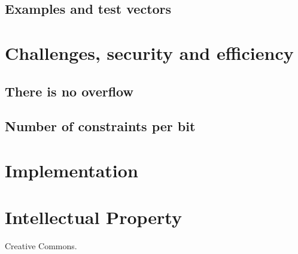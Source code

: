 \documentclass[11pt]{article}
\begin{document}
		\subsection{Examples and test vectors}
		
	\section{Challenges, security and efficiency}

	
		\subsection{There is no overflow}	 						
		\subsection{Number of constraints per bit  }
																			
			
	\section{Implementation}										
	
	\section {Intellectual Property}					
	Creative Commons.

	
		

\end{document}
